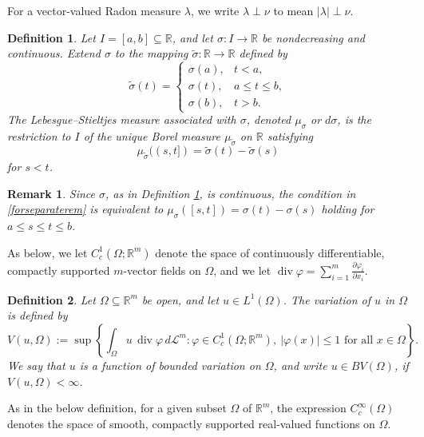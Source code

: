 \documentclass{publicadapt}
\newtheorem{remark}{Remark}
\newtheorem{definition}{Definition}
\begin{document}
 For a vector-valued Radon measure \(\lambda\), we write \(\lambda\perp\nu\) to mean \(|\lambda|\perp\nu\).

\begin{definition}\label{defineLSm}
Let \(I=[a,b]\subseteq\mathbb R\), and let
\(\sigma:I\to\mathbb R\) be nondecreasing and continuous. Extend
 \(\sigma\) to the mapping \(\widetilde\sigma:\mathbb R\to\mathbb R\) defined by
$$
\widetilde\sigma(t)=
\begin{cases}
\sigma(a), & t<a,\\
\sigma(t), & a\le t\le b,\\
\sigma(b), & t>b.
\end{cases}
$$
The \emph{Lebesgue--Stieltjes measure} associated with \(\sigma\), denoted 
 \(\mu_\sigma\) or \(d\sigma\), is the restriction to \(I\) of the unique
Borel measure \(\mu_{\widetilde\sigma}\) on \(\mathbb R\) satisfying
\begin{equation}\label{forseparaterem}
\mu_{\widetilde\sigma}((s,t])
 =
\widetilde\sigma(t)-\widetilde\sigma(s)
\end{equation}
 for $s < t$. 
\end{definition}

\begin{remark}
 Since \(\sigma\), as in Definition \ref{defineLSm}, is continuous, the condition in \eqref{forseparaterem} 
 is equivalent to 
$
\mu_\sigma([s,t])
=
\sigma(t)-\sigma(s)
$ holding for 
$ a \leq s \leq t \leq b$. 
\end{remark}

 As below, we let $C_c^1(\Omega;\mathbb R^m)$ denote the space of continuously differentiable, compactly supported $m$-vector fields on $\Omega$, and we let 
 $ \operatorname{div}\varphi = \sum_{i=1}^m \frac{\partial \varphi_i}{\partial x_i}$.

\begin{definition}\label{defineBV}
 Let $\Omega\subseteq\mathbb R^m$ be open, and let $u\in L^1(\Omega)$. The \emph{variation} of $u$ in $\Omega$ is defined by
$$ V(u,\Omega) := \sup\left\{
\int_{\Omega} u\,\operatorname{div}\varphi \, d\mathcal L^m : \varphi\in C_c^1(\Omega;\mathbb R^m),\
|\varphi(x)|\leq 1 \text{ for all } x\in\Omega
\right\}. $$
We say that $u$ is a \emph{function of bounded variation} on $\Omega$,
and write $ u\in BV(\Omega)$, if $ V(u,\Omega)<\infty$. 
\end{definition}

 As in the below definition, for a given subset $\Omega$ of $\mathbb{R}^{m}$, 
 the expression $C_{c}^{\infty}(\Omega)$ denotes the 
 space of smooth, compactly supported real-valued functions on $\Omega$. 
\end{document}
